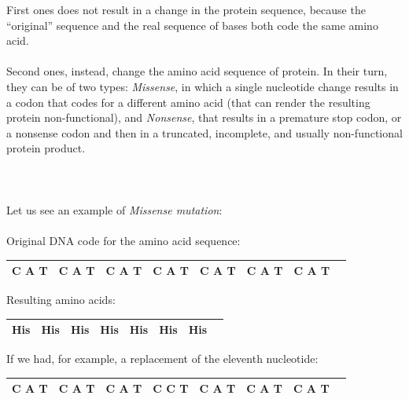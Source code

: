 First ones does not result in a change in the protein sequence, because the “original” sequence and the real sequence of bases both code the same amino acid.
\\
\\Second ones, instead, change the amino acid sequence of protein. In their turn, they can be of two types: \emph{Missense}, in which a single nucleotide change results in a codon that codes for a different amino acid (that can render the resulting protein non-functional), and \emph{Nonsense}, that results in a premature stop codon, or a nonsense codon and then in a truncated, incomplete, and usually non-functional protein product.
\\
\\
\\
\\Let us see an example of \emph{Missense mutation}:
\\
\\Original DNA code for the amino acid sequence:

\vspace{5mm}

\begin{tabular}{|l|l|l|l|l|l|rl|}
\hline
C   A   T         &	C   A   T         &	C   A   T         &	C   A   T         &	C   A   T         &	C   A   T         &	C   A   T  	&       \\
\hline
\end{tabular}

\vspace{15mm}

Resulting amino acids:

\vspace{5mm}

\begin{tabular}{|l|l|l|l|l|l|rl|}
\hline
His         &	His         &	His         &	His         &	His         &	His         &	His  	&       \\
\hline
\end{tabular}

\vspace{25mm}

If we had, for example, a replacement of the eleventh nucleotide:

\vspace{5mm}

\begin{tabular}{|l|l|l|l|l|l|rl|}
\hline
C   A   T         &	C   A   T         &	C   A   T         &	C   \textbf{C}   T         &	C   A   T         &	C   A   T         &	C   A   T  	&       \\
\hline
\end{tabular}

